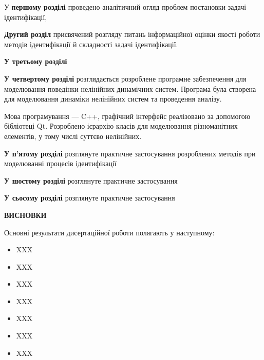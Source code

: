 \documentclass[a4paper,12pt]{atuaref}
\newcommand{\xsect}[1]{\medskip\begin{center}\textbf{#1}\end{center}\medskip\penalty10000}
\begin{document}
У \textbf{першому розділі}
проведено аналітичний огляд проблем постановки задачі ідентифікації,






\textbf{Другий розділ}
присвячений розгляду питань інформаційної оцінки якості роботи
методів ідентифікації  й складності задачі ідентифікації.






\medskip

\textbf{У третьому розділі}



\textbf{У четвертому розділі} розглядається розроблене програмне
забезпечення
для моделювання
поведінки  нелінійних динамічних систем.
Програма була створена для моделювання динаміки
нелінійних систем та проведення аналізу.

Мова програмування --- C++,
графічний інтерфейс реалізовано за допомогою
бібліотеці Qt.
Розроблено ієрархію класів для
моделювання різноманітних елементів,
у тому числі суттєво нелінійних.




\textbf{У п'ятому розділі}
розглянуте практичне застосування розроблених методів при моделюванні
процесів ідентифікації




\textbf{У шостому розділі}
розглянуте практичне застосування


\textbf{У сьосому розділі}
розглянуте практичне застосування

\xsect{ВИСНОВКИ}

Основні результати дисертаційної роботи полягають у наступному:

\begin{itemize}

\item
XXX


\item
XXX


\item
XXX


\item
XXX


\item
XXX


\item
XXX


\item
XXX


\end{itemize}
\end{document}
